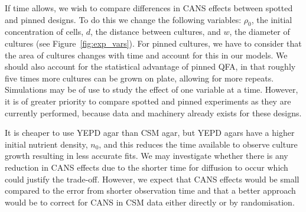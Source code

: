 If time allows, we wish to compare differences in CANS effects between
spotted and pinned designs. To do this we change the following
variables: \(\rho_{0}\), the initial concentration of cells, \(d\),
the distance between cultures, and \(w\), the diameter of cultures
(see Figure~\ref{fig:exp_vars}). For pinned cultures, we have to
consider that the area of cultures changes with time and account for
this in our models. We should also account for the statistical
advantage of pinned QFA, in that roughly five times more cultures can
be grown on plate, allowing for more repeats. Simulations may be of
use to study the effect of one variable at a time. However, it is of
greater priority to compare spotted and pinned experiments as they are
currently performed, because data and machinery already exists for
these designs.

It is cheaper to use YEPD agar than CSM agar, but YEPD agars have a
higher initial nutrient density, \(n_{0}\), and this reduces the time
available to observe culture growth resulting in less accurate
fits. We may investigate whether there is any reduction in CANS
effects due to the shorter time for diffusion to occur which could
justify the trade-off. However, we expect that CANS effects would be
small compared to the error from shorter observation time and that a
better approach would be to correct for CANS in CSM data either
directly or by randomisation.


